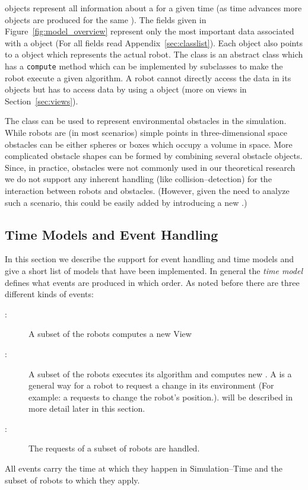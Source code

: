  objects represent all information about a  for a given time (as time advances more  objects are produced for the same ). The fields given in Figure~\ref{fig:model_overview} represent only the most important data associated with a  object (For all fields read Appendix~\ref{sec:classlist}). Each  object also points to a  object which represents the actual robot. The  class is an abstract class which has a \texttt{compute} method which can be implemented by subclasses to make the robot execute a given algorithm. A robot cannot directly access the data in its  objects but has to access data by using a  object (more on views in Section~\ref{sec:views}).\smallskip

The  class can be used to represent environmental obstacles in the simulation. While robots are (in most scenarios) simple points in three-dimensional space obstacles can be either spheres or boxes which occupy a volume in space. More complicated obstacle shapes can be formed by combining several obstacle objects. Since, in practice, obstacles were not commonly used in our theoretical research we do not support any inherent handling (like collision--detection) for the interaction between robots and obstacles. (However, given the need to analyze such a scenario, this could be easily added by introducing a new .)

\subsection{Time Models and Event Handling} \label{sec:events}

In this section we describe the support for event handling and time models and give a short list of models that have been implemented. In general the \emph{time model} defines what events are produced in which order. As noted before there are three different kinds of events: 
\begin{description}
\item[:] A subset of the robots computes a new View
\item[:] A subset of the robots executes its algorithm and computes new . A  is a general way for a robot to request a change in its environment (For example: a  requests to change the robot's position.).  will be described in more detail later in this section.
\item[:] The requests of a subset of robots are handled.
\end{description}
All events carry the time at which they happen in Simulation--Time and the subset of robots to which they apply.

